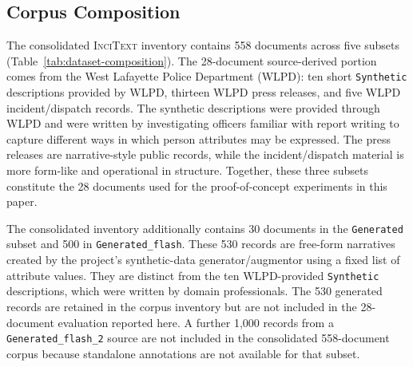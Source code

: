 \documentclass[sigconf,nonacm]{acmart}
\newcommand{\incitext}{\textsc{InciText}}
\begin{document}
\subsection{Corpus Composition}
\label{subsec:dataset-composition}

The consolidated \incitext{} inventory contains 558 documents across five
subsets (Table~\ref{tab:dataset-composition}). The 28-document source-derived
portion comes from the West Lafayette Police Department (WLPD): ten short
\texttt{Synthetic} descriptions provided by WLPD, thirteen WLPD press releases,
and five WLPD incident/dispatch records. The synthetic descriptions were
provided through WLPD and were written by investigating officers
familiar with report writing to capture different ways in which person
attributes may be expressed. The press releases are narrative-style public
records, while the incident/dispatch material is more form-like and operational
in structure. Together, these three subsets constitute the 28 documents used
for the proof-of-concept experiments in this paper.

The consolidated inventory additionally contains 30 documents in the
\texttt{Generated} subset and 500 in \texttt{Generated\_flash}. These 530
records are free-form narratives created by the project's synthetic-data
generator/augmentor using a fixed list of attribute values. They are distinct
from the ten WLPD-provided \texttt{Synthetic} descriptions, which were written
by domain professionals. The 530 generated records are retained in the corpus
inventory but are not included in the 28-document evaluation reported here. A
further 1,000 records from a \texttt{Generated\_flash\_2} source are not
included in the consolidated 558-document corpus because standalone annotations
are not available for that subset.
\end{document}
